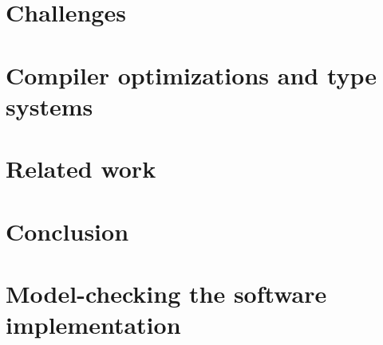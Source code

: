 \documentclass{phd-thesis}
\begin{document}



\chapter{Challenges}


\chapter[Optimizations and type systems]{Compiler optimizations and type systems}



\chapter{Related work}\label{cha:related}


\chapter{Conclusion}


\appendix
\chapter[Model-checking the implementation]{Model-checking the software implementation}\label{sec:full-model}


%


\backmatter

\printindex
\end{document}
